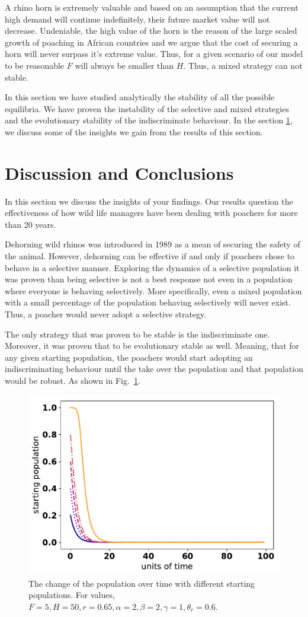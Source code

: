 \documentclass[10pt]{article}
\begin{document}
A rhino horn is extremely valuable and based on an assumption that the current
high demand will continue indefinitely, their future market value will not decrease.
Undeniable, the high value of the horn is the reason of the large scaled growth
of poaching in African countries and we argue that the cost of securing a horn
will never surpass it's extreme value. Thus, for a given scenario of our model
to be reasonable \(F\) will always be smaller than \(H\). Thus, a mixed strategy
can not stable.

In this section we have studied analytically the stability of all the possible
equilibria. We have proven the instability of the selective and mixed strategies
and the evolutionary stability of the indiscriminate behaviour. In the section
\ref{section:discussion}, we discuss some of the insights we
gain from the results of this section.

\section{Discussion and Conclusions}
\label{section:discussion}

In this section we discuss the insights of your findings. Our results question
the effectiveness of how wild life managers have been dealing with poachers
for more than 20 years. 

Dehorning wild rhinos was introduced in 1989 as a mean of securing the
safety of the animal. However, dehorning can be effective if and only if
poachers chose to behave in a selective manner. Exploring the
dynamics of a selective population it was proven than being selective is not
a best response not even in a population where everyone is behaving selectively.
More specifically, even a mixed population with a small percentage of the 
population behaving selectively will never exist. Thus, a poacher would never
adopt a selective strategy. 

The only strategy that was proven to be stable is the indiscriminate one.
Moreover, it was proven that to be evolutionary stable as well. Meaning, 
that for any given starting population, the poachers would start adopting an
indiscriminating behaviour until the take over the population and that population
would be robust. As shown in Fig.~\ref{fig:indiscriminate_ess}.

\begin{figure}[!htbp]
	\centering
	\includegraphics[width=0.4\linewidth]{images/IndiscriminateESS.pdf}
	\caption{\label{fig:indiscriminate_ess} The change of the population over 
	time with different starting populations. For values, \(F=5, H=50, r=0.65, 
	\alpha=2, \beta=2, \gamma=1, \theta_r=0.6\).}
\end{figure}
\end{document}
